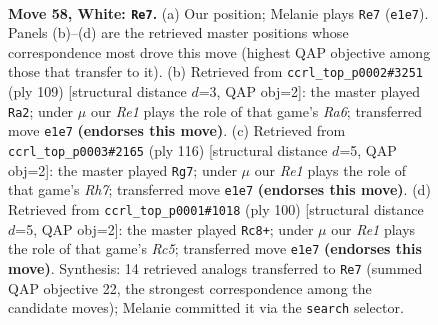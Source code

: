\documentclass[11pt]{article}
\begin{document}
\clearpage

\begin{figure}[p]\centering
\begin{subfigure}{0.46\textwidth}\centering
\resizebox{\linewidth}{!}{%
\newchessgame
\chessboard[
  setfen={5r1k/8/P7/8/8/7K/8/4R3 w - - 1 58},
  showmover=false,
  pgfstyle=straightmove, color=movearrow, markmove={e1-e7}
]}
\caption{}
\end{subfigure}\hfill
\begin{subfigure}{0.46\textwidth}\centering
\resizebox{\linewidth}{!}{%
\newchessgame
\chessboard[
  setfen={8/8/4k3/7p/7P/r7/8/5R1K b - - 0 55},
  showmover=false,
  pgfstyle=straightmove, color=movearrow, markmove={a3-a2}
]}
\caption{}
\end{subfigure}
\\[4pt]
\begin{subfigure}{0.46\textwidth}\centering
\resizebox{\linewidth}{!}{%
\newchessgame
\chessboard[
  setfen={4k3/7R/4r3/3p4/3P4/5K2/8/8 w - - 5 59},
  showmover=false,
  pgfstyle=straightmove, color=movearrow, markmove={h7-g7}
]}
\caption{}
\end{subfigure}\hfill
\begin{subfigure}{0.46\textwidth}\centering
\resizebox{\linewidth}{!}{%
\newchessgame
\chessboard[
  setfen={6k1/8/6r1/2R5/8/1P2n3/8/7K w - - 0 51},
  showmover=false,
  pgfstyle=straightmove, color=movearrow, markmove={c5-c8}
]}
\caption{}
\end{subfigure}
\caption{\textbf{Move 58, White: \texttt{Re7}.} (a) Our position; Melanie plays \texttt{Re7} (\texttt{e1e7}). Panels (b)--(d) are the retrieved master positions whose correspondence most drove this move (highest QAP objective among those that transfer to it). (b) Retrieved from \texttt{ccrl\_top\_p0002\#3251} (ply 109) [structural distance $d$=3, QAP obj=2]: the master played \texttt{Ra2}; under $\mu$ our \emph{Re1} plays the role of that game's \emph{Ra6}; transferred move \texttt{e1e7} \textbf{(endorses this move)}. (c) Retrieved from \texttt{ccrl\_top\_p0003\#2165} (ply 116) [structural distance $d$=5, QAP obj=2]: the master played \texttt{Rg7}; under $\mu$ our \emph{Re1} plays the role of that game's \emph{Rh7}; transferred move \texttt{e1e7} \textbf{(endorses this move)}. (d) Retrieved from \texttt{ccrl\_top\_p0001\#1018} (ply 100) [structural distance $d$=5, QAP obj=2]: the master played \texttt{Rc8+}; under $\mu$ our \emph{Re1} plays the role of that game's \emph{Rc5}; transferred move \texttt{e1e7} \textbf{(endorses this move)}. Synthesis: 14 retrieved analogs transferred to \texttt{Re7} (summed QAP objective 22, the strongest correspondence among the candidate moves); Melanie committed it via the \texttt{search} selector.}
\label{fig:thought-m114}
\end{figure}
\end{document}
